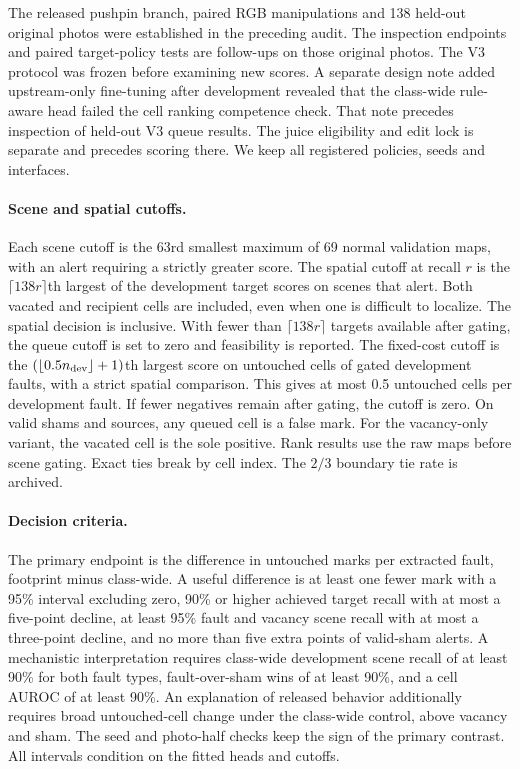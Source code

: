 The released pushpin branch, paired RGB manipulations and 138 held-out original photos were established in the preceding audit. The inspection endpoints and paired target-policy tests are follow-ups on those original photos. The V3 protocol was frozen before examining new scores. A separate design note added upstream-only fine-tuning after development revealed that the class-wide rule-aware head failed the cell ranking competence check. That note precedes inspection of held-out V3 queue results. The juice eligibility and edit lock is separate and precedes scoring there. We keep all registered policies, seeds and interfaces.

\paragraph{Scene and spatial cutoffs.}
Each scene cutoff is the 63rd smallest maximum of 69 normal validation maps, with an alert requiring a strictly greater score. The spatial cutoff at recall $r$ is the $\lceil 138r\rceil$th largest of the development target scores on scenes that alert. Both vacated and recipient cells are included, even when one is difficult to localize. The spatial decision is inclusive. With fewer than $\lceil 138r\rceil$ targets available after gating, the queue cutoff is set to zero and feasibility is reported. The fixed-cost cutoff is the $(\lfloor0.5 n_{\rm dev}\rfloor+1)$th largest score on untouched cells of gated development faults, with a strict spatial comparison. This gives at most 0.5 untouched cells per development fault. If fewer negatives remain after gating, the cutoff is zero. On valid shams and sources, any queued cell is a false mark. For the vacancy-only variant, the vacated cell is the sole positive. Rank results use the raw maps before scene gating. Exact ties break by cell index. The $2/3$ boundary tie rate is archived.

\paragraph{Decision criteria.}
The primary endpoint is the difference in untouched marks per extracted fault, footprint minus class-wide. A useful difference is at least one fewer mark with a 95\% interval excluding zero, 90\% or higher achieved target recall with at most a five-point decline, at least 95\% fault and vacancy scene recall with at most a three-point decline, and no more than five extra points of valid-sham alerts. A mechanistic interpretation requires class-wide development scene recall of at least 90\% for both fault types, fault-over-sham wins of at least 90\%, and a cell AUROC of at least 90\%. An explanation of released behavior additionally requires broad untouched-cell change under the class-wide control, above vacancy and sham. The seed and photo-half checks keep the sign of the primary contrast. All intervals condition on the fitted heads and cutoffs.

